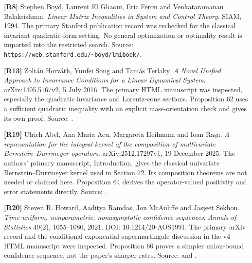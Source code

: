 \documentclass[11pt,letterpaper]{article}
\begin{document}
\textbf{{[}R8{]}} Stephen Boyd, Laurent El Ghaoui, Eric Feron and
Venkataramanan Balakrishnan. \emph{Linear Matrix Inequalities in System
and Control Theory}. SIAM, 1994. The primary Stanford publication record
was rechecked for the classical invariant quadratic-form setting. No
general optimization or optimality result is imported into the
restricted search. Source:
\texttt{https://web.stanford.edu/\textasciitilde{}boyd/lmibook/}.

\textbf{{[}R13{]}} Zoltán Horváth, Yunfei Song and Tamás Terlaky.
\emph{A Novel Unified Approach to Invariance Conditions for a Linear
Dynamical System}. arXiv:1405.5167v2, 5 July 2016. The primary HTML
manuscript was inspected, especially the quadratic invariance and
Lorentz-cone sections. Proposition 62 uses a sufficient quadratic
inequality with an explicit mass-orientation check and gives its own
proof. Source: .

\textbf{{[}R19{]}} Ulrich Abel, Ana Maria Acu, Margareta Heilmann and
Ioan Raşa. \emph{A representation for the integral kernel of the
composition of multivariate Bernstein--Durrmeyer operators}.
arXiv:2512.17297v1, 19 December 2025. The authors' primary manuscript,
Introduction, gives the classical univariate Bernstein--Durrmeyer kernel
used in Section 72. Its composition theorems are not needed or claimed
here. Proposition 64 derives the operator-valued positivity and error
statements directly. Source:
.

\textbf{{[}R20{]}} Steven R. Howard, Aaditya Ramdas, Jon McAuliffe and
Jasjeet Sekhon. \emph{Time-uniform, nonparametric, nonasymptotic
confidence sequences}. \emph{Annals of Statistics} 49(2), 1055--1080,
2021. DOI: 10.1214/20-AOS1991. The primary arXiv record and the
conditional exponential-supermartingale discussion in the v4 HTML
manuscript were inspected. Proposition 66 proves a simpler union-bound
confidence sequence, not the paper's sharper rates. Source:
 and
.

\endgroup
\end{document}
